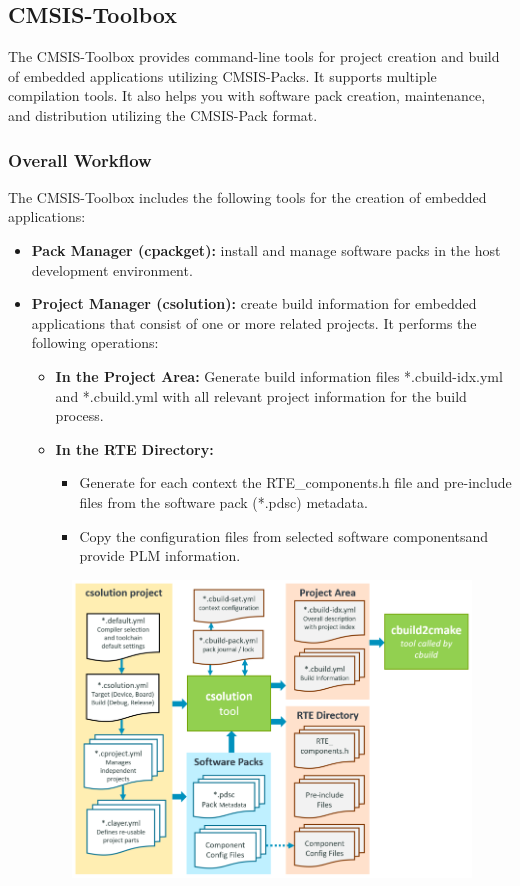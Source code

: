 \subsection{CMSIS-Toolbox} The CMSIS-Toolbox provides command-line tools for project creation and build of embedded applications utilizing CMSIS-Packs. It supports multiple compilation tools. It also helps you with software pack creation, maintenance, and distribution utilizing the CMSIS-Pack format.
\subsubsection{Overall Workflow}
The CMSIS-Toolbox includes the following tools for the creation of embedded applications:
\begin{itemize}
    \item \textbf{ Pack Manager (cpackget):} install and manage software packs in the host development environment.
    \item \textbf{Project Manager (csolution):} create build information for embedded applications that consist of one or more related projects. It performs the following operations:
    \begin{itemize}
        \item \textbf{In the Project Area:} Generate build information files *.cbuild-idx.yml and *.cbuild.yml with all relevant project information for the build process.
        \item \textbf{In the RTE Directory:}
        \begin{itemize}
            \item Generate for each context the RTE\_components.h file and pre-include files from the software pack (*.pdsc) metadata.
            \item Copy the configuration files from selected software componentsand provide PLM information.
        \end{itemize}
    \end{itemize}
    \begin{figure}[H]
      \centering
      \includegraphics[width=15cm]{img/ST_Summer_Internship/csolution-operation.png}

\end{figure}
\end{itemize}
